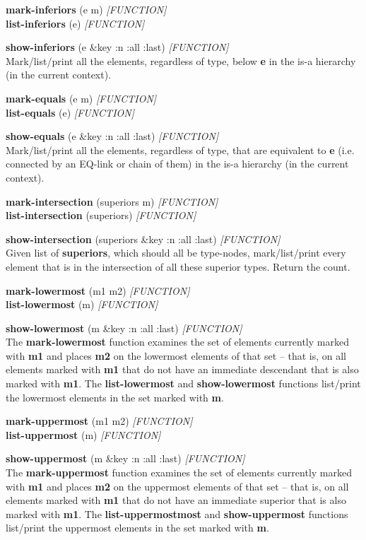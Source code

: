 \documentclass[titlepage,twoside,openright,11pt]{article}
\begin{document}
\textbf{mark-inferiors} (e m) \emph{{[}FUNCTION{]}}\\
\textbf{list-inferiors} (e) \emph{{[}FUNCTION{]}}

\textbf{show-inferiors} (e \&key :n :all :last) \emph{{[}FUNCTION{]}}\\
Mark/list/print all the elements, regardless of type, below \textbf{e}
in the is-a hierarchy (in the current context).

\textbf{mark-equals} (e m) \emph{{[}FUNCTION{]}}\\
\textbf{list-equals} (e) \emph{{[}FUNCTION{]}}

\textbf{show-equals} (e \&key :n :all :last) \emph{{[}FUNCTION{]}}\\
Mark/list/print all the elements, regardless of type, that are
equivalent to \textbf{e} (i.e. connected by an EQ-link or chain of them)
in the is-a hierarchy (in the current context).

\textbf{mark-intersection} (superiors m) \emph{{[}FUNCTION{]}}\\
\textbf{list-intersection} (superiors) \emph{{[}FUNCTION{]}}

\textbf{show-intersection} (superiors \&key :n :all :last)
\emph{{[}FUNCTION{]}\\
}Given list of \textbf{superiors}, which should all be type-nodes,
mark/list/print every element that is in the intersection of all these
superior types. Return the count.

\textbf{mark-lowermost} (m1 m2) \emph{{[}FUNCTION{]}\\
}\textbf{list-lowermost} (m) \emph{{[}FUNCTION{]}}

\textbf{show-lowermost} (m \&key :n :all :last) \emph{{[}FUNCTION{]}}\\
The \textbf{mark-lowermost} function examines the set of elements
currently marked with \textbf{m1} and places \textbf{m2} on the
lowermost elements of that set -- that is, on all elements marked with
\textbf{m1} that do not have an immediate descendant that is also marked
with \textbf{m1}. The \textbf{list-lowermost} and
\textbf{show-lowermost} functions list/print the lowermost elements in
the set marked with \textbf{m}.

\textbf{mark-uppermost} (m1 m2) \emph{{[}FUNCTION{]}}\\
\textbf{list-uppermost} (m) \emph{{[}FUNCTION{]}}

\textbf{show-uppermost} (m \&key :n :all :last) \emph{{[}FUNCTION{]}}\\
The \textbf{mark-uppermost} function examines the set of elements
currently marked with \textbf{m1} and places \textbf{m2} on the
uppermost elements of that set -- that is, on all elements marked with
\textbf{m1} that do not have an immediate superior that is also marked
with \textbf{m1}. The \textbf{list-uppermostmost} and
\textbf{show-uppermost} functions list/print the uppermost elements in
the set marked with \textbf{m}.
\end{document}

